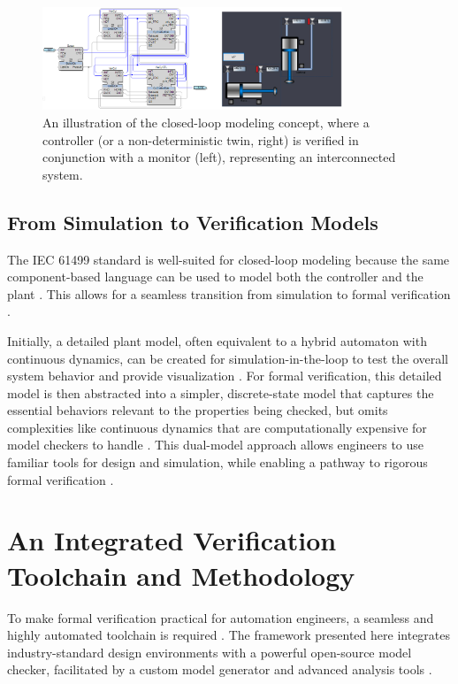 \begin{figure}[h]
\centering
\includegraphics[width=0.8\textwidth]{chapters/images/chapter2/wholesystem_withhmi.png}
\caption{An illustration of the closed-loop modeling concept, where a controller (or a non-deterministic twin, right) is verified in conjunction with a monitor (left), representing an interconnected system.}
\label{fig:closed_loop}
\end{figure}

\subsection{From Simulation to Verification Models}

The IEC 61499 standard is well-suited for closed-loop modeling because the same component-based language can be used to model both the controller and the plant \cite{vyatkin2003verification}. This allows for a seamless transition from simulation to formal verification \cite{patil2015formal}.

Initially, a detailed plant model, often equivalent to a hybrid automaton with continuous dynamics, can be created for simulation-in-the-loop to test the overall system behavior and provide visualization \cite{vyatkin2008closed}. For formal verification, this detailed model is then abstracted into a simpler, discrete-state model that captures the essential behaviors relevant to the properties being checked, but omits complexities like continuous dynamics that are computationally expensive for model checkers to handle \cite{drozdov2016formal}. This dual-model approach allows engineers to use familiar tools for design and simulation, while enabling a pathway to rigorous formal verification \cite{xavier2022process}.

\section{An Integrated Verification Toolchain and Methodology}\label{sec:toolchain}

To make formal verification practical for automation engineers, a seamless and highly automated toolchain is required \cite{xavier2021}. The framework presented here integrates industry-standard design environments with a powerful open-source model checker, facilitated by a custom model generator and advanced analysis tools \cite{fb2smv}.

